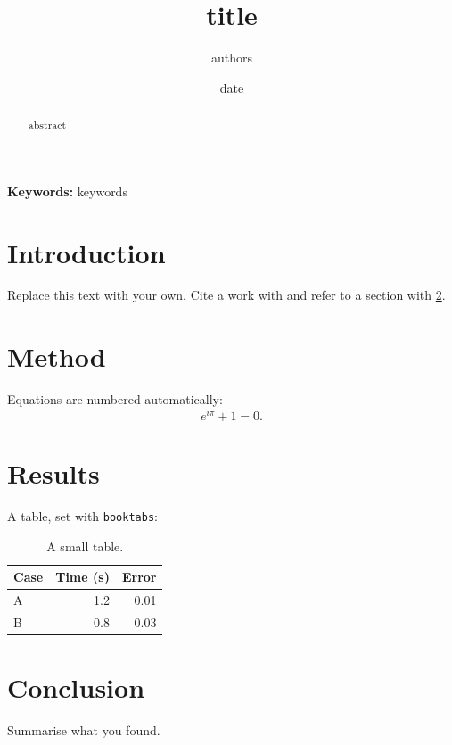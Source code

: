 \documentclass[11pt]{article}
\title{{{title}}}
\author{{{authors}}}
\date{{{date}}}
\begin{document}
\maketitle
\begin{abstract}
{{abstract}}
\end{abstract}
\noindent\textbf{Keywords:} {{keywords}}

\section{Introduction}
Replace this text with your own. Cite a work with \cite{knuth1984} and refer to a
section with \ref{sec:method}.

\section{Method}\label{sec:method}
Equations are numbered automatically:
\begin{equation}
  e^{i\pi} + 1 = 0.
\end{equation}

\section{Results}
A table, set with \texttt{booktabs}:
\begin{table}[h]
  \centering
  \begin{tabular}{lrr}
    \toprule
    Case & Time (s) & Error \\
    \midrule
    A & 1.2 & 0.01 \\
    B & 0.8 & 0.03 \\
    \bottomrule
  \end{tabular}
  \caption{A small table.}
  \label{tab:results}
\end{table}

\section{Conclusion}
Summarise what you found.



\end{document}

